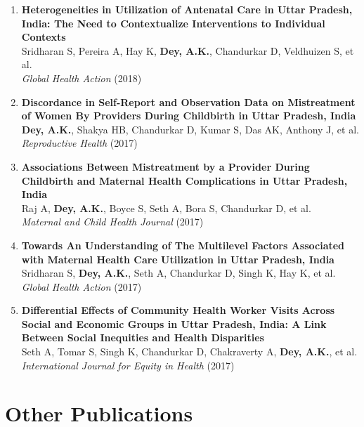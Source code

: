 \documentclass[11pt,letterpaper]{article}
\begin{document}
\begin{enumerate}
\item \textbf{Heterogeneities in Utilization of Antenatal Care in Uttar Pradesh, India: The Need to Contextualize Interventions to Individual Contexts}\\
Sridharan S, Pereira A, Hay K, \textbf{Dey, A.K.}, Chandurkar D, Veldhuizen S, et al.\\
\emph{Global Health Action} (2018) 

\item \textbf{Discordance in Self-Report and Observation Data on Mistreatment of Women By Providers During Childbirth in Uttar Pradesh, India}\\
\textbf{Dey, A.K.}, Shakya HB, Chandurkar D, Kumar S, Das AK, Anthony J, et al.\\
\emph{Reproductive Health} (2017) 

\item \textbf{Associations Between Mistreatment by a Provider During Childbirth and Maternal Health Complications in Uttar Pradesh, India}\\
Raj A, \textbf{Dey, A.K.}, Boyce S, Seth A, Bora S, Chandurkar D, et al.\\
\emph{Maternal and Child Health Journal} (2017) 

\item \textbf{Towards An Understanding of The Multilevel Factors Associated with Maternal Health Care Utilization in Uttar Pradesh, India}\\
Sridharan S, \textbf{Dey, A.K.}, Seth A, Chandurkar D, Singh K, Hay K, et al.\\
\emph{Global Health Action} (2017) 

\item \textbf{Differential Effects of Community Health Worker Visits Across Social and Economic Groups in Uttar Pradesh, India: A Link Between Social Inequities and Health Disparities}\\
Seth A, Tomar S, Singh K, Chandurkar D, Chakraverty A, \textbf{Dey, A.K.}, et al.\\
\emph{International Journal for Equity in Health} (2017) 
\end{enumerate}
\section*{Other Publications}
\label{sec:org8f8e26a}
\end{document}

